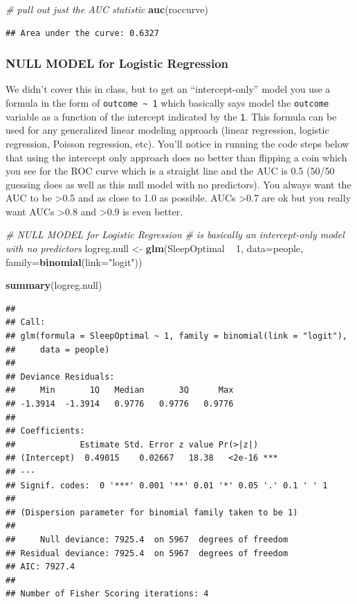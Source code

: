 \documentclass[]{article}
\newenvironment{Shaded}{\begin{snugshade}}{\end{snugshade}}
\newcommand{\KeywordTok}[1]{\textcolor[rgb]{0.13,0.29,0.53}{\textbf{{#1}}}}
\newcommand{\DataTypeTok}[1]{\textcolor[rgb]{0.13,0.29,0.53}{{#1}}}
\newcommand{\DecValTok}[1]{\textcolor[rgb]{0.00,0.00,0.81}{{#1}}}
\newcommand{\StringTok}[1]{\textcolor[rgb]{0.31,0.60,0.02}{{#1}}}
\newcommand{\CommentTok}[1]{\textcolor[rgb]{0.56,0.35,0.01}{\textit{{#1}}}}
\newcommand{\NormalTok}[1]{{#1}}
\begin{document}
\begin{Shaded}
\begin{Highlighting}[]
\CommentTok{# pull out just the AUC statistic}
\KeywordTok{auc}\NormalTok{(roccurve)}
\end{Highlighting}
\end{Shaded}

\begin{verbatim}
## Area under the curve: 0.6327
\end{verbatim}

\subsubsection{NULL MODEL for Logistic
Regression}\label{null-model-for-logistic-regression-1}

We didn't cover this in class, but to get an ``intercept-only'' model
you use a formula in the form of \texttt{outcome\ \textasciitilde{}\ 1}
which basically says model the \texttt{outcome} variable as a function
of the intercept indicated by the \texttt{1}. This formula can be used
for any generalized linear modeling approach (linear regression,
logistic regression, Poisson regression, etc). You'll notice in running
the code steps below that using the intercept only approach does no
better than flipping a coin which you see for the ROC curve which is a
straight line and the AUC is 0.5 (50/50 guessing does as well as this
null model with no predictors). You always want the AUC to be
\textgreater{}0.5 and as close to 1.0 as possible. AUCs
\textgreater{}0.7 are ok but you really want AUCs \textgreater{}0.8 and
\textgreater{}0.9 is even better.

\begin{Shaded}
\begin{Highlighting}[]
\CommentTok{# NULL MODEL for Logistic Regression }
\CommentTok{# is basically an intercept-only model with no predictors}
\NormalTok{logreg.null <-}\StringTok{ }\KeywordTok{glm}\NormalTok{(SleepOptimal ~}\StringTok{ }\DecValTok{1}\NormalTok{, }
                   \DataTypeTok{data=}\NormalTok{people, }
                   \DataTypeTok{family=}\KeywordTok{binomial}\NormalTok{(}\DataTypeTok{link=}\StringTok{"logit"}\NormalTok{))}

\KeywordTok{summary}\NormalTok{(logreg.null)}
\end{Highlighting}
\end{Shaded}

\begin{verbatim}
## 
## Call:
## glm(formula = SleepOptimal ~ 1, family = binomial(link = "logit"), 
##     data = people)
## 
## Deviance Residuals: 
##     Min       1Q   Median       3Q      Max  
## -1.3914  -1.3914   0.9776   0.9776   0.9776  
## 
## Coefficients:
##             Estimate Std. Error z value Pr(>|z|)    
## (Intercept)  0.49015    0.02667   18.38   <2e-16 ***
## ---
## Signif. codes:  0 '***' 0.001 '**' 0.01 '*' 0.05 '.' 0.1 ' ' 1
## 
## (Dispersion parameter for binomial family taken to be 1)
## 
##     Null deviance: 7925.4  on 5967  degrees of freedom
## Residual deviance: 7925.4  on 5967  degrees of freedom
## AIC: 7927.4
## 
## Number of Fisher Scoring iterations: 4
\end{verbatim}
\end{document}
